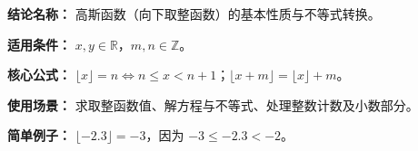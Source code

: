 \textbf{结论名称：} 高斯函数（向下取整函数）的基本性质与不等式转换。

\textbf{适用条件：} $x,y\in\mathbb R$，$m,n\in\mathbb Z$。

\textbf{核心公式：} $\lfloor x\rfloor=n\iff n\le x<n+1$；$\lfloor x+m\rfloor=\lfloor x\rfloor+m$。

\textbf{使用场景：} 求取整函数值、解方程与不等式、处理整数计数及小数部分。

\textbf{简单例子：} $\lfloor-2.3\rfloor=-3$，因为 $-3\le-2.3<-2$。
